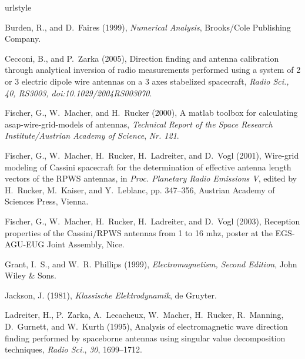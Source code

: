 \documentclass[a4paper,14pt]{extbook}
\begin{document}
\backmatter
\begin{thebibliography}{24}
\providecommand{\natexlab}[1]{#1}
\expandafter\ifx\csname urlstyle\endcsname\relax
  \providecommand{\doi}[1]{doi:\discretionary{}{}{}#1}\else
  \providecommand{\doi}{doi:\discretionary{}{}{}\begingroup
  \urlstyle{rm}\Url}\fi

Burden, R., and D.~Faires (1999), \textit{Numerical Analysis}, Brooks/Cole
  Publishing Company.

Cecconi, B., and P.~Zarka (2005), Direction finding and antenna calibration
  through analytical inversion of radio measurements performed using a system
  of 2 or 3 electric dipole wire antennas on a 3 axes stabelized spacecraft,
  \textit{Radio Sci., 40, RS3003, doi:10.1029/2004RS003070}.

Fischer, G., W.~Macher, and H.~Rucker (2000), A matlab toolbox for calculating
  asap-wire-grid-models of antennas, \textit{Technical Report of the Space
  Research Institute/Austrian Academy of Science}, \textit{Nr. 121}.

Fischer, G., W.~Macher, H.~Rucker, H.~Ladreiter, and D.~Vogl (2001), Wire-grid
  modeling of Cassini spacecraft for the determination of effective antenna
  length vectors of the RPWS antennas, in \textit{Proc. Planetary Radio
  Emissions V}, edited by H.~Rucker, M.~Kaiser, and Y.~Leblanc, pp. 347--356,
  Austrian Academy of Sciences Press, Vienna.

Fischer, G., W.~Macher, H.~Rucker, H.~Ladreiter, and D.~Vogl (2003), Reception
  properties of the Cassini/RPWS antennas from 1 to 16 mhz, poster at the
  EGS-AGU-EUG Joint Assembly, Nice.

Grant, I.~S., and W.~R. Phillips (1999), \textit{Electromagnetism, Second
  Edition}, John Wiley \& Sons.

Jackson, J. (1981), \textit{Klassische Elektrodynamik}, de Gruyter.

Ladreiter, H., P.~Zarka, A.~Lecacheux, W.~Macher, H.~Rucker, R.~Manning,
  D.~Gurnett, and W.~Kurth (1995), Analysis of electromagnetic wave direction
  finding performed by spaceborne antennas using singular value decomposition
  techniques, \textit{Radio Sci.}, \textit{30}, 1699--1712.


\end{thebibliography}
\end{document}
